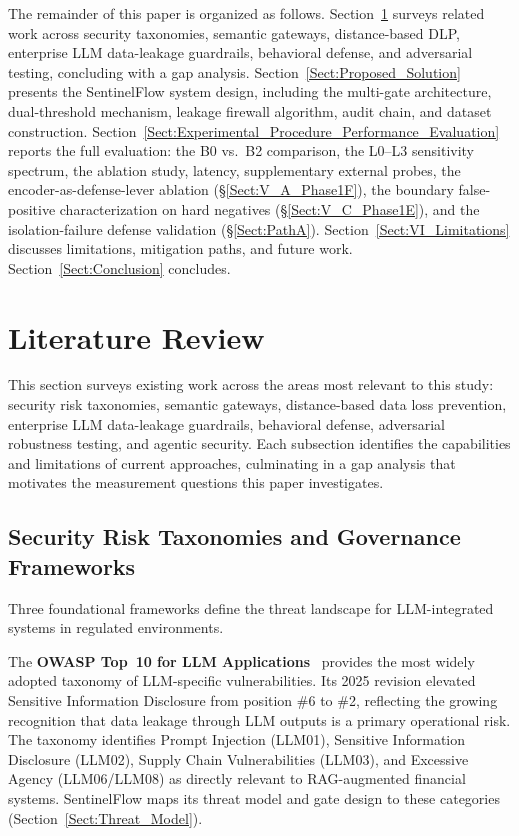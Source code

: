 \documentclass[journal]{IEEEtran}
\begin{document}
The remainder of this paper is organized as follows. Section~\ref{Sect:Literature_Review} surveys related work across security taxonomies, semantic gateways, distance-based DLP, enterprise LLM data-leakage guardrails, behavioral defense, and adversarial testing, concluding with a gap analysis. Section~\ref{Sect:Proposed_Solution} presents the SentinelFlow system design, including the multi-gate architecture, dual-threshold mechanism, leakage firewall algorithm, audit chain, and dataset construction. Section~\ref{Sect:Experimental_Procedure_Performance_Evaluation} reports the full evaluation: the B0 vs.\ B2 comparison, the L0--L3 sensitivity spectrum, the ablation study, latency, supplementary external probes, the encoder-as-defense-lever ablation (\S\ref{Sect:V_A_Phase1F}), the boundary false-positive characterization on hard negatives (\S\ref{Sect:V_C_Phase1E}), and the isolation-failure defense validation (\S\ref{Sect:PathA}). Section~\ref{Sect:VI_Limitations} discusses limitations, mitigation paths, and future work. Section~\ref{Sect:Conclusion} concludes.

\section{Literature Review}
\label{Sect:Literature_Review}
%

This section surveys existing work across the areas most relevant to this study: security risk taxonomies, semantic gateways, distance-based data loss prevention, enterprise LLM data-leakage guardrails, behavioral defense, adversarial robustness testing, and agentic security. Each subsection identifies the capabilities and limitations of current approaches, culminating in a gap analysis that motivates the measurement questions this paper investigates.

\subsection{Security Risk Taxonomies and Governance Frameworks}
\label{Sect:LR_Taxonomies}

Three foundational frameworks define the threat landscape for LLM-integrated systems in regulated environments.

The \textbf{OWASP Top~10 for LLM Applications}~\cite{owasp_llm_2025} provides the most widely adopted taxonomy of LLM-specific vulnerabilities. Its 2025 revision elevated Sensitive Information Disclosure from position \#6 to \#2, reflecting the growing recognition that data leakage through LLM outputs is a primary operational risk. The taxonomy identifies Prompt Injection (LLM01), Sensitive Information Disclosure (LLM02), Supply Chain Vulnerabilities (LLM03), and Excessive Agency (LLM06/LLM08) as directly relevant to RAG-augmented financial systems. SentinelFlow maps its threat model and gate design to these categories (Section~\ref{Sect:Threat_Model}).
\end{document}
